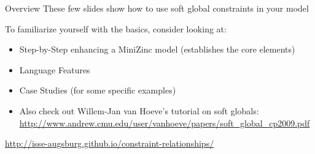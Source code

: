 \documentclass[10pt,xcolor={dvipsnames},fleqn]{beamer}
\newcommand{\cemph}[1]{\alert{#1}}
\begin{document}
%
%
%
%

\begin{frame}{Overview}
These few slides show how to use soft global constraints in your model


\vspace*{2ex}

To familiarize yourself with the basics, consider looking at:
\begin{itemize}
\item Step-by-Step enhancing a MiniZinc model (establishes the core elements)
\item Language Features 
\item Case Studies (for some specific examples)

\vspace*{1ex}
\item Also check out Willem-Jan van Hoeve's tutorial on soft globals: \url{http://www.andrew.cmu.edu/user/vanhoeve/papers/soft_global_cp2009.pdf}
\end{itemize}

\vspace*{2ex}

\url{http://isse-augsburg.github.io/constraint-relationships/}
\end{frame}
\end{document}
